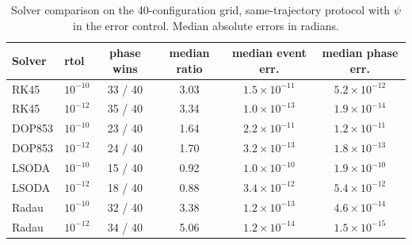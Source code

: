 \begin{table}[!htbp]
\centering
\caption{Solver comparison on the 40-configuration grid, same-trajectory protocol with $\psi$ in the error control. Median absolute errors in radians.}
\label{tab:solvers}
\begin{tabular}{llcccc}
\toprule
Solver & rtol & phase wins & median ratio & median event err. & median phase err. \\
\midrule
RK45 & $10^{-10}$ & 33 / 40 & 3.03 & $1.5\times10^{-11}$ & $5.2\times10^{-12}$ \\
RK45 & $10^{-12}$ & 35 / 40 & 3.34 & $1.0\times10^{-13}$ & $1.9\times10^{-14}$ \\
DOP853 & $10^{-10}$ & 23 / 40 & 1.64 & $2.2\times10^{-11}$ & $1.2\times10^{-11}$ \\
DOP853 & $10^{-12}$ & 24 / 40 & 1.70 & $3.2\times10^{-13}$ & $1.8\times10^{-13}$ \\
LSODA & $10^{-10}$ & 15 / 40 & 0.92 & $1.0\times10^{-10}$ & $1.9\times10^{-10}$ \\
LSODA & $10^{-12}$ & 18 / 40 & 0.88 & $3.4\times10^{-12}$ & $5.4\times10^{-12}$ \\
Radau & $10^{-10}$ & 32 / 40 & 3.38 & $1.2\times10^{-13}$ & $4.6\times10^{-14}$ \\
Radau & $10^{-12}$ & 34 / 40 & 5.06 & $1.2\times10^{-14}$ & $1.5\times10^{-15}$ \\
\bottomrule
\end{tabular}
\end{table}
